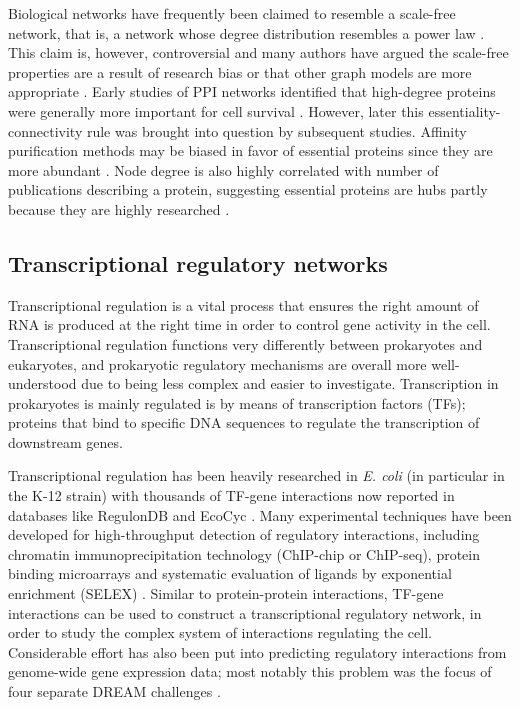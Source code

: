 Biological networks have frequently been claimed to resemble a scale-free network, that is, a network whose degree distribution resembles a power law \cite{Jeong2001,Barabasi2004,Goh2002}. This claim is, however, controversial and many authors have argued the scale-free properties are a result of research bias or that other graph models are more appropriate \cite{Przulj2004,Khanin2006,Przulj2007,Lima-Mendez2009,Broido2019}. Early studies of PPI networks identified that high-degree proteins were generally more important for cell survival \cite{Jeong2001,Hahn2004}. However, later this essentiality-connectivity rule was brought into question by subsequent studies. Affinity purification methods may be biased in favor of essential proteins since they are more abundant \cite{Ivanic2009}. Node degree is also highly correlated with number of publications describing a protein, suggesting essential proteins are hubs partly because they are highly researched \cite{Rolland2014}.

\subsection{Transcriptional regulatory networks}
Transcriptional regulation is a vital process that ensures the right amount of RNA is produced at the right time in order to control gene activity in the cell. Transcriptional regulation functions very differently between prokaryotes and eukaryotes, and prokaryotic regulatory mechanisms are overall more well-understood due to being less complex and easier to investigate. Transcription in prokaryotes is mainly regulated is by means of transcription factors (TFs); proteins that bind to specific DNA sequences to regulate the transcription of downstream genes.

Transcriptional regulation has been heavily researched in \emph{E. coli} (in particular in the K-12 strain) with thousands of TF-gene interactions now reported in databases like RegulonDB \cite{Santos-Zavaleta2018} and EcoCyc \cite{Keseler2016}. Many experimental techniques have been developed for high-throughput detection of regulatory interactions, including chromatin immunoprecipitation technology (ChIP-chip or ChIP-seq), protein binding microarrays and systematic evaluation of ligands by exponential enrichment (SELEX) \cite{Geertz2010,Weiss2013}.
Similar to protein-protein interactions, TF-gene interactions can be used to construct a transcriptional regulatory network, in order to study the complex system of interactions regulating the cell.
Considerable effort has also been put into predicting regulatory interactions from genome-wide gene expression data; most notably this problem was the focus of four separate DREAM challenges \cite{Stolovitzky2009,Marbach2010,Prill2010,Marbach2012}.

